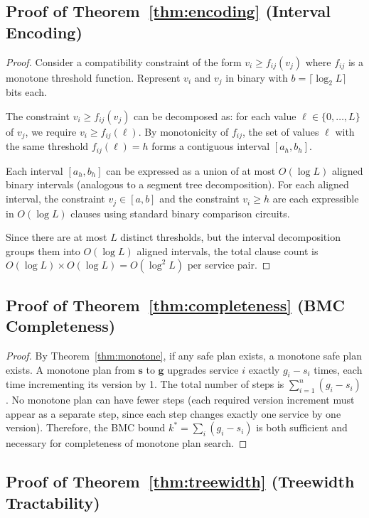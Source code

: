 \documentclass[10pt,twocolumn]{article}
\begin{document}
\subsection{Proof of Theorem~\ref{thm:encoding} (Interval Encoding)}

\begin{proof}
Consider a compatibility constraint of the form
$v_i \geq f_{ij}(v_j)$ where $f_{ij}$ is a monotone threshold
function. Represent $v_i$ and $v_j$ in binary with
$b = \lceil \log_2 L \rceil$ bits each.

The constraint $v_i \geq f_{ij}(v_j)$ can be decomposed as:
for each value $\ell \in \{0, \ldots, L\}$ of $v_j$, we
require $v_i \geq f_{ij}(\ell)$. By monotonicity of $f_{ij}$,
the set of values $\ell$ with the same threshold $f_{ij}(\ell) = h$
forms a contiguous interval $[a_h, b_h]$.

Each interval $[a_h, b_h]$ can be expressed as a union of at
most $O(\log L)$ aligned binary intervals (analogous to a
segment tree decomposition). For each aligned interval, the
constraint $v_j \in [a, b]$ and the constraint $v_i \geq h$
are each expressible in $O(\log L)$ clauses using standard
binary comparison circuits.

Since there are at most $L$ distinct thresholds, but the
interval decomposition groups them into $O(\log L)$ aligned
intervals, the total clause count is $O(\log L) \times
O(\log L) = O(\log^2 L)$ per service pair.
\end{proof}

\subsection{Proof of Theorem~\ref{thm:completeness} (BMC Completeness)}

\begin{proof}
By Theorem~\ref{thm:monotone}, if any safe plan exists, a
monotone safe plan exists. A monotone plan from $\mathbf{s}$
to $\mathbf{g}$ upgrades service $i$ exactly $g_i - s_i$ times,
each time incrementing its version by 1. The total number of
steps is $\sum_{i=1}^{n}(g_i - s_i)$. No monotone plan can
have fewer steps (each required version increment must appear
as a separate step, since each step changes exactly one
service by one version). Therefore, the BMC bound
$k^{*} = \sum_i(g_i - s_i)$ is both sufficient and necessary
for completeness of monotone plan search.
\end{proof}

\subsection{Proof of Theorem~\ref{thm:treewidth} (Treewidth Tractability)}
\end{document}
